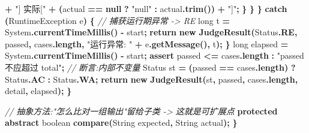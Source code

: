 \documentclass[
  11pt,
]{ctexart}
\newenvironment{Shaded}{\begin{snugshade}}{\end{snugshade}}
\newcommand{\BuiltInTok}[1]{#1}
\newcommand{\CommentTok}[1]{\textcolor[rgb]{0.56,0.35,0.01}{\textit{#1}}}
\newcommand{\ControlFlowTok}[1]{\textcolor[rgb]{0.13,0.29,0.53}{\textbf{#1}}}
\newcommand{\DataTypeTok}[1]{\textcolor[rgb]{0.13,0.29,0.53}{#1}}
\newcommand{\FunctionTok}[1]{\textcolor[rgb]{0.13,0.29,0.53}{\textbf{#1}}}
\newcommand{\KeywordTok}[1]{\textcolor[rgb]{0.13,0.29,0.53}{\textbf{#1}}}
\newcommand{\NormalTok}[1]{#1}
\newcommand{\OperatorTok}[1]{\textcolor[rgb]{0.81,0.36,0.00}{\textbf{#1}}}
\newcommand{\StringTok}[1]{\textcolor[rgb]{0.31,0.60,0.02}{#1}}
\begin{document}
\begin{Shaded}
\begin{Highlighting}[]
                           \OperatorTok{+} \StringTok{"] 实际["} \OperatorTok{+} \OperatorTok{(}\NormalTok{actual }\OperatorTok{==} \KeywordTok{null} \OperatorTok{?} \StringTok{"null"} \OperatorTok{:}\NormalTok{ actual}\OperatorTok{.}\FunctionTok{trim}\OperatorTok{())} \OperatorTok{+} \StringTok{"]"}\OperatorTok{;}
                \OperatorTok{\}}
            \OperatorTok{\}}
        \OperatorTok{\}} \ControlFlowTok{catch} \OperatorTok{(}\BuiltInTok{RuntimeException}\NormalTok{ e}\OperatorTok{)} \OperatorTok{\{}                          \CommentTok{// 捕获运行期异常 {-}\textgreater{} RE}
            \DataTypeTok{long}\NormalTok{ t }\OperatorTok{=} \BuiltInTok{System}\OperatorTok{.}\FunctionTok{currentTimeMillis}\OperatorTok{()} \OperatorTok{{-}}\NormalTok{ start}\OperatorTok{;}
            \ControlFlowTok{return} \KeywordTok{new} \FunctionTok{JudgeResult}\OperatorTok{(}\NormalTok{Status}\OperatorTok{.}\FunctionTok{RE}\OperatorTok{,}\NormalTok{ passed}\OperatorTok{,}\NormalTok{ cases}\OperatorTok{.}\FunctionTok{length}\OperatorTok{,}
                                   \StringTok{"运行异常: "} \OperatorTok{+}\NormalTok{ e}\OperatorTok{.}\FunctionTok{getMessage}\OperatorTok{(),}\NormalTok{ t}\OperatorTok{);}
        \OperatorTok{\}}
        \DataTypeTok{long}\NormalTok{ elapsed }\OperatorTok{=} \BuiltInTok{System}\OperatorTok{.}\FunctionTok{currentTimeMillis}\OperatorTok{()} \OperatorTok{{-}}\NormalTok{ start}\OperatorTok{;}
        \ControlFlowTok{assert}\NormalTok{ passed }\OperatorTok{\textless{}=}\NormalTok{ cases}\OperatorTok{.}\FunctionTok{length} \OperatorTok{:} \StringTok{"passed 不应超过 total"}\OperatorTok{;}   \CommentTok{// 断言:内部不变量}
\NormalTok{        Status st }\OperatorTok{=} \OperatorTok{(}\NormalTok{passed }\OperatorTok{==}\NormalTok{ cases}\OperatorTok{.}\FunctionTok{length}\OperatorTok{)} \OperatorTok{?}\NormalTok{ Status}\OperatorTok{.}\FunctionTok{AC} \OperatorTok{:}\NormalTok{ Status}\OperatorTok{.}\FunctionTok{WA}\OperatorTok{;}
        \ControlFlowTok{return} \KeywordTok{new} \FunctionTok{JudgeResult}\OperatorTok{(}\NormalTok{st}\OperatorTok{,}\NormalTok{ passed}\OperatorTok{,}\NormalTok{ cases}\OperatorTok{.}\FunctionTok{length}\OperatorTok{,}\NormalTok{ detail}\OperatorTok{,}\NormalTok{ elapsed}\OperatorTok{);}
    \OperatorTok{\}}

    \CommentTok{// 抽象方法:"怎么比对一组输出"留给子类 {-}\textgreater{} 这就是可扩展点}
    \KeywordTok{protected} \KeywordTok{abstract} \DataTypeTok{boolean} \FunctionTok{compare}\OperatorTok{(}\BuiltInTok{String}\NormalTok{ expected}\OperatorTok{,} \BuiltInTok{String}\NormalTok{ actual}\OperatorTok{);}
\OperatorTok{\}}
\end{Highlighting}
\end{Shaded}
\end{document}
